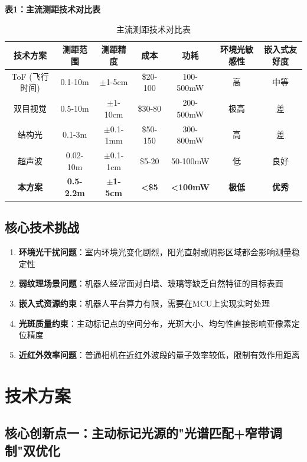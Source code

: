 \documentclass[12pt, a4paper]{ctexart}
\begin{document}
\textbf{表1：主流测距技术对比表}

\begin{table}[htbp]
\centering
\caption{主流测距技术对比表}
\begin{tabular}{ccccccc}
\toprule
技术方案 & 测距范围 & 测距精度 & 成本 & 功耗 & 环境光敏感性 & 嵌入式友好度 \\
\midrule
ToF (飞行时间) & 0.1-10m & $\pm$1-5cm & \$20-100 & 100-500mW & 高 & 中等 \\
双目视觉 & 0.5-10m & $\pm$1-10cm & \$30-80 & 200-500mW & 极高 & 差 \\
结构光 & 0.1-3m & $\pm$0.1-1mm & \$50-150 & 300-800mW & 高 & 差 \\
超声波 & 0.02-10m & $\pm$0.1-1cm & \$5-20 & 50-100mW & 低 & 良好 \\
\textbf{本方案} & \textbf{0.5-2.2m} & \textbf{$\pm$1-5cm} & \textbf{<\$5} & \textbf{<100mW} & \textbf{极低} & \textbf{优秀} \\
\bottomrule
\end{tabular}
\end{table}

\subsection{核心技术挑战}

\begin{enumerate}
\item \textbf{环境光干扰问题}：室内环境光变化剧烈，阳光直射或阴影区域都会影响测量稳定性
\item \textbf{弱纹理场景问题}：机器人经常面对白墙、玻璃等缺乏自然特征的目标表面
\item \textbf{嵌入式资源约束}：机器人平台算力有限，需要在MCU上实现实时处理
\item \textbf{光斑质量约束}：主动标记点的空间分布，光斑大小、均匀性直接影响亚像素定位精度
\item \textbf{近红外效率问题}：普通相机在近红外波段的量子效率较低，限制有效作用距离
\end{enumerate}

\section{技术方案}

\subsection{核心创新点一：主动标记光源的"光谱匹配+窄带调制"双优化}
\end{document}
